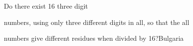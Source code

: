 Do there exist 16 three digit 

numbers, using only three different digits in all, so that the all 

numbers give different residues when divided by 16?Bulgaria